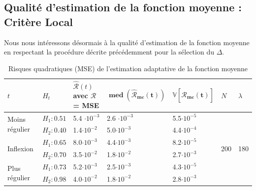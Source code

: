 \pagebreak

\subsection{Qualité d'estimation de la fonction moyenne : Critère Local}

Nous nous intéressons désormais à la qualité d'estimation de la fonction moyenne en respectant la procédure décrite précédemment pour la sélection du $\Delta$.

\begin{table}[H]
	\centering
	\begin{tabularx}{\linewidth}{|X|X|X|X|X|X|X|}
		\toprule
		$t$                                  & $H_t$        & $\widehat{\mathcal R}(t)$ avec $\mathcal R$ = MSE & $\mathbf{\operatorname{med}(\widehat{\mathcal R}_{mc}(t))}$ & $\mathbf{\mathds V[\widehat{\mathcal R}_{mc}(t)]}$ & $N$                       & $\lambda$
		\\
		\midrule
		\multirow{2}{\hsize}{Moins régulier} & $H_1 : 0.51$ & 5.4 $\cdot 10^{-3}$                               & 2.6  $\cdot 10^{-3}$                                        & 5.5$\cdot 10^{-5}$                                 & \multirow{6}{\hsize}{200} & \multirow{6}{\hsize}{180}
		\\
		                                     & $H_2 : 0.40$ & 1.4$\cdot 10^{-2}$                                & 5.0$\cdot 10^{-3}$                                          & 4.4$\cdot 10^{-4}$                                 &                           &
		\\
		\cmidrule{1-5}
		\multirow{2}{\hsize}{Inflexion}      & $H_1 : 0.65$ & 8.0$\cdot 10^{-3}$                                & 4.4$\cdot 10^{-3}$                                          & 8.2$\cdot 10^{-5}$                                 &                           &
		\\
		                                     & $H_2 : 0.70$ & 3.5$\cdot 10^{-2}$                                & 1.8$\cdot 10^{-2}$                                          & 2.7$\cdot 10^{-3}$                                 &                           &
		\\
		\cmidrule{1-5}
		\multirow{2}{\hsize}{Plus régulier}  & $H_1 : 0.73$ & 5.2$\cdot 10^{-3}$                                & 2.5$\cdot 10^{-3}$                                          & 4.3$\cdot 10^{-5}$                                 &                           &
		\\
		                                     & $H_2 : 0.98$ & 4.0$\cdot 10^{-2}$                                & 1.8$\cdot 10^{-2}$                                          & 2.8$\cdot 10^{-3}$                                 &                           &
		\\
		\bottomrule
	\end{tabularx}
	\caption{Risques quadratiques (MSE) de l'estimation adaptative de la fonction moyenne}
\end{table}

